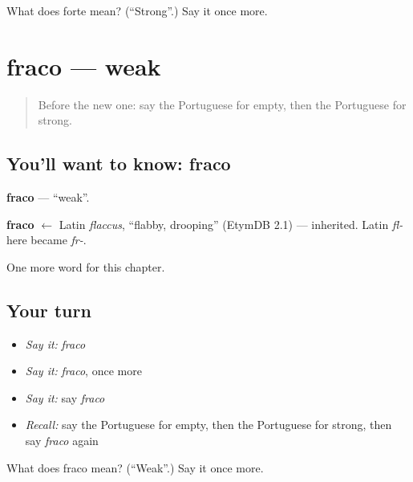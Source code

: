 \begin{tcolorbox}[breakable,colback=teal!4,colframe=teal!35!black,title={Before you move on}]
What does forte mean? (\textquotedblleft{}Strong\textquotedblright{}.) Say it once more.
\end{tcolorbox}
\section[fraco]{fraco — weak}

\label{lesson:PT-C68-fraco}



\begin{quote}
Before the new one: say the Portuguese for empty, then the Portuguese for strong.
\end{quote}

\subsection*{You'll want to know: fraco}
\textbf{fraco} — \textquotedblleft{}weak\textquotedblright{}.

\begin{cousinweb}
\textbf{fraco} $\leftarrow$ Latin \emph{flaccus}, \textquotedblleft{}flabby, drooping\textquotedblright{} (EtymDB 2.1) — inherited. Latin \emph{fl-} here became \emph{fr-}.
\end{cousinweb}

\begin{grammarlens}[title={What you've built}]
One more word for this chapter.
\end{grammarlens}

\subsection*{Your turn}
\begin{itemize}
\raggedright
  \item \emph{Say it:} \emph{fraco}
  \item \emph{Say it:} \emph{fraco}, once more
  \item \emph{Say it:} say \emph{fraco}
  \item \emph{Recall:} say the Portuguese for empty, then the Portuguese for strong, then say \emph{fraco} again
\end{itemize}

\begin{tcolorbox}[breakable,colback=teal!4,colframe=teal!35!black,title={Before you move on}]
What does fraco mean? (\textquotedblleft{}Weak\textquotedblright{}.) Say it once more.
\end{tcolorbox}
